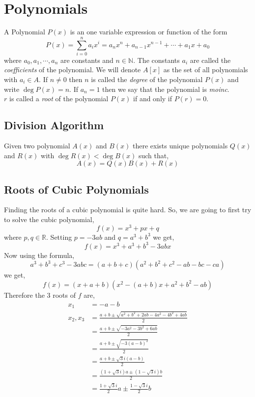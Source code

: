 \documentclass[11pt,numbers=noenddot,svgnames]{scrbook}
\DeclareMathOperator{\Deg}{deg}
\begin{document}
\chapter{Polynomials}

\begin{definition}
    A Polynomial $P(x)$ is an one variable expression or function of the form
    \[
        P(x) = \sum_{i=0}^{n} a_{i}x^{i} = a_{n}x^{n} + a_{n-1}x^{n-1} + \cdots +a_{1}x + a_{0}
    \]
    where $a_{0},a_{1}, \cdots, a_{n}$ are constants and $n \in \mathbb{N}$. The constants $a_{i}$ are called the 
    \textit{coefficients} of the polynomial. We will denote $A[x]$ as the set of all polynomials with $a_{i} \in A$. If 
    $n\neq 0$ then $n$ is called the \textit{degree} of the polynomial $P(x)$ and write $\Deg P(x)=n$. 
    If $a_{n} = 1$ then we say that the polynomial is \textit{moinc}. \\
    $r$ is called a \textit{root} of the polynomial $P(x)$ if and only if $P(r)=0$.
\end{definition}

\section{Division Algorithm}

\begin{theorem}\label{thm:div-algo}
    Given two polynomial $A(x)$ and $B(x)$ there exists unique polynomials $Q(x)$ and $R(x)$ with $\Deg R(x) < \Deg B(x)$ 
    such that,
    \[
        A(x) = Q(x)B(x) + R(x)
    \]
\end{theorem}

\section{Roots of Cubic Polynomials}

Finding the roots of a cubic polynomial is quite hard. So, we are going to first try to solve the cubic polynomial,
\[
    f(x) = x^{3} + px + q
\]
where $p, q \in \mathbb{R}$.
Setting $p=-3ab$ and $q = a^{3} + b^{3}$ we get,
\[
    f(x) = x^{3} + a^{3} + b^{3} - 3abx
\]
Now using the formula,
\[
    a^{3} + b^{3} + c^{3} - 3abc = (a+b+c)(a^{2} + b^{2} + c^{2} - ab - bc - ca)
\]
we get,
\[
    f(x) = (x+a+b)(x^{2} -(a+b)x + a^{2} + b^{2} - ab)
\]
Therefore the 3 roots of $f$ are,
\begin{align*}
    x_{1}        &= -a-b \\
    x_{2}, x_{3} &= \frac{a+b \pm \sqrt{a^{2} + b^{2} + 2ab - 4a^{2} - 4b^{2} + 4ab}}{2}\\
                 &= \frac{a+b \pm \sqrt{-3a^{2} -3b^{2} + 6ab}}{2} \\
                 &= \frac{a+b \pm \sqrt{-3(a-b)^{2}}}{2} \\
                 &= \frac{a+b \pm \sqrt{3}i(a-b)}{2} \\
                 &= \frac{(1 + \sqrt{3}i)a \pm (1 - \sqrt{3}i)b}{2} \\
                 &= \frac{1+\sqrt{3}i}{2}a \pm \frac{1-\sqrt{3}i}{2}b
\end{align*}
\end{document}
